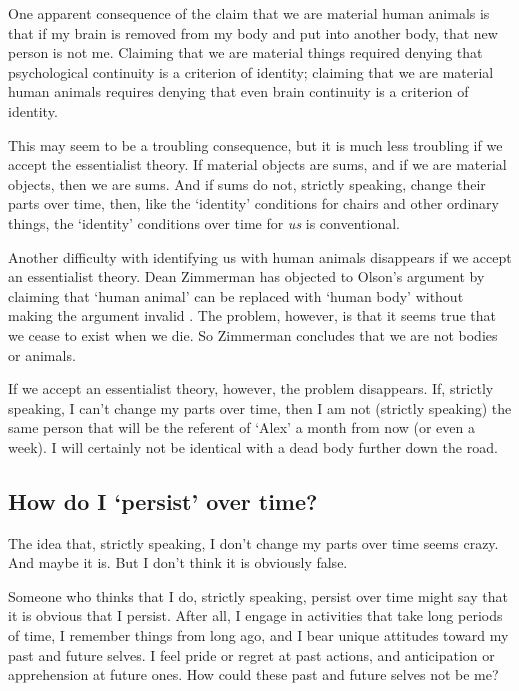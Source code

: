 \documentclass[11pt]{article}
\begin{document}
\begin{spacing}{1.5}
One apparent consequence of the claim that we are material human
animals is that if my brain is removed from my body and put into
another body, that new person is not me.  Claiming that we are
material things required denying that psychological continuity is a
criterion of identity; claiming that we are material human animals
requires denying that even brain continuity is a criterion of
identity.

This may seem to be a troubling consequence, but it is much less
troubling if we accept the essentialist theory.  If material objects
are sums, and if we are material objects, then we are sums.  And if
sums do not, strictly speaking, change their parts over time, then,
like the `identity' conditions for chairs and other ordinary things,
the `identity' conditions over time for {\em us} is conventional.

Another difficulty with identifying us with human animals disappears
if we accept an essentialist theory.  Dean Zimmerman has objected to
Olson's argument by claiming that `human animal' can be replaced with
`human body' without making the argument invalid
\citeyearpar[24]{zimmerman2008a}.  The problem, however, is that it
seems true that we cease to exist when we die.  So Zimmerman concludes
that we are not bodies or animals.

If we accept an essentialist theory, however, the problem disappears.
If, strictly speaking, I can't change my parts over time, then I am
not (strictly speaking) the same person that will be the referent of
`Alex' a month from now (or even a week).  I will certainly not be
identical with a dead body further down the road.

\subsection{How do I `persist' over time?}
\label{person-persist}
The idea that, strictly speaking, I don't change my parts over time
seems crazy.  And maybe it is.  But I don't think it is obviously
false.

Someone who thinks that I do, strictly speaking, persist over time
might say that it is obvious that I persist.  After all, I engage in
activities that take long periods of time, I remember things from long
ago, and I bear unique attitudes toward my past and future selves.  I
feel pride or regret at past actions, and anticipation or apprehension
at future ones.  How could these past and future selves not be me?


\end{spacing}
\end{document}
